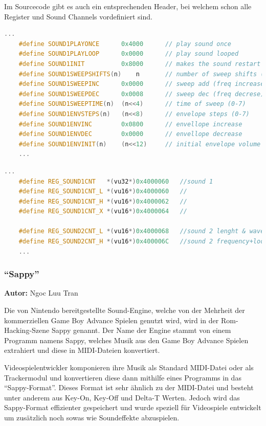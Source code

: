 \documentclass[11pt,a4paper]{scrartcl}
\newcommand{\AutorNgoc} {
    \vspace{-4mm}
    \large \textbf{Autor:} Ngoc Luu Tran \normalsize
    \vspace{2mm}
}
\begin{document}
Im Sourcecode gibt es auch ein entsprechenden Header, bei welchem schon alle Register und Sound Channels vordefiniert sind.

\vspace{5mm}
\begin{lstlisting}[language=C++, caption={1. Ausschnitt aus Belogic gba.h}, label={list:gbaheader2}]
    ...
	#define SOUND1PLAYONCE		0x4000		// play sound once
	#define SOUND1PLAYLOOP		0x0000		// play sound looped
	#define SOUND1INIT			0x8000		// makes the sound restart
	#define SOUND1SWEEPSHIFTS(n)	n		// number of sweep shifts (0-7)
	#define SOUND1SWEEPINC		0x0000		// sweep add (freq increase)
	#define SOUND1SWEEPDEC		0x0008		// sweep dec (freq decrese)
	#define SOUND1SWEEPTIME(n)	(n<<4)		// time of sweep (0-7)
	#define SOUND1ENVSTEPS(n)	(n<<8)		// envelope steps (0-7)
	#define SOUND1ENVINC		0x0800		// envellope increase
	#define SOUND1ENVDEC		0x0000		// envellope decrease
	#define SOUND1ENVINIT(n)	(n<<12)		// initial envelope volume (0-15)
	...
\end{lstlisting}
\newpage
\vspace{5mm}
\begin{lstlisting}[language=C++, caption={2. Ausschnitt aus Belogic gba.h}, label={list:gbaheader1}]
    ...
	#define REG_SOUND1CNT   *(vu32*)0x4000060	//sound 1
	#define REG_SOUND1CNT_L *(vu16*)0x4000060	//
	#define REG_SOUND1CNT_H *(vu16*)0x4000062	//
	#define REG_SOUND1CNT_X *(vu16*)0x4000064	//

	#define REG_SOUND2CNT_L *(vu16*)0x4000068	//sound 2 lenght & wave duty
	#define REG_SOUND2CNT_H *(vu16*)0x400006C	//sound 2 frequency+loop+reset
	...
\end{lstlisting}


\subsubsection{\enquote{Sappy}}
\AutorNgoc

Die von Nintendo bereitgestellte Sound-Engine, welche von der Mehrheit der kommerziellen Game Boy Advance Spielen genutzt wird, wird in der Rom-Hacking-Szene Sappy genannt. 
Der Name der Engine stammt von einem Programm namens Sappy, welches Musik aus den Game Boy Advance Spielen extrahiert und diese in MIDI-Dateien konvertiert.


Videospielentwickler komponieren ihre Musik als Standard MIDI-Datei oder als Trackermodul und konvertieren diese dann mithilfe eines Programms in das "`Sappy-Format"'. Dieses Format ist sehr \"{a}hnlich zu der MIDI-Datei und besteht unter anderem aus Key-On, Key-Off und Delta-T Werten. Jedoch wird das Sappy-Format effizienter gespeichert und wurde speziell f\"{u}r Videospiele entwickelt um zus\"{a}tzlich noch sowas wie Soundeffekte abzuspielen.
\end{document}
